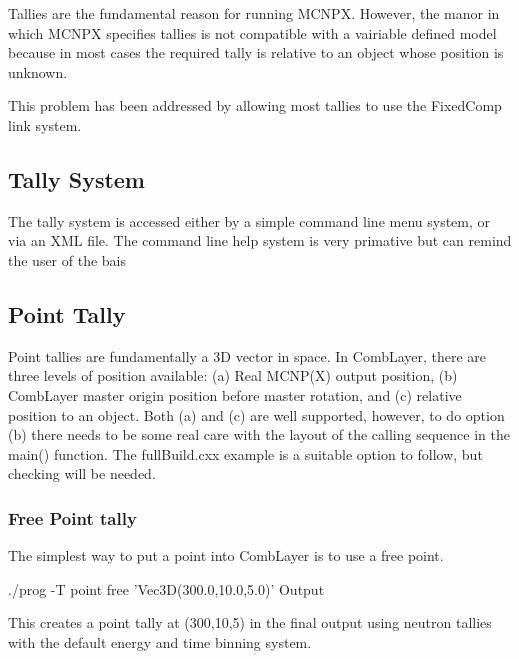 
Tallies are the fundamental reason for running MCNPX. However, the
manor in which MCNPX specifies tallies is not compatible with a
vairiable defined model because in most cases the required tally is relative 
to an object whose position is unknown. 

This problem has been addressed by allowing most tallies to use the 
FixedComp link system. 

\subsection{Tally System}

The tally system is accessed either by a simple command line menu
system, or via an XML file. The command line help system is very
primative but can remind the user of the bais

\subsection{Point Tally}
\label{PointTally}

Point tallies are fundamentally a 3D vector in space. In CombLayer,
there are three levels of position available: (a) Real MCNP(X) output
position, (b) CombLayer master origin position before master rotation,
and (c) relative position to an object. Both (a) and (c) are well
supported, however, to do option (b) there needs to be some real care
with the layout of the calling sequence in the main() function. The
fullBuild.cxx example is a suitable option to follow, but checking
will be needed.

\subsubsection{Free Point tally}

The simplest way to put a point into CombLayer is to use a free point.
\begin{bash}
./prog -T point free 'Vec3D(300.0,10.0,5.0)' Output
\end{bash}

This creates a point tally at (300,10,5) in the final output using
neutron tallies with the default energy and time binning system.

